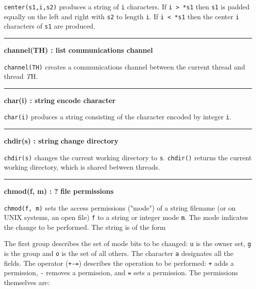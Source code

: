 \noindent
{}\texttt{center(s1,i,s2)} produces a
string of \texttt{i} characters. If \texttt{i {\textgreater} *s1} then
\texttt{s1} is padded equally on the left and right with \texttt{s2} to
length \texttt{i}. If \texttt{i {\textless} *s1} then the center
\texttt{i} characters of \texttt{s1} are produced.

\bigskip
\hrule\vspace{0.1cm}
\noindent
{\bf channel(TH) : list } \hfill {\bf communications channel}

\noindent
{}\texttt{channel(TH)} creates a communications channel
between the current thread and thread {\textit TH}.

\bigskip
\hrule\vspace{0.1cm}
\noindent
{\bf char(i) : string } \hfill {\bf encode character}

\noindent
{}\texttt{char(i)} produces a string consisting of the
character encoded by integer \texttt{i}.

\bigskip
\hrule\vspace{0.1cm}
\noindent
{\bf chdir(s) : string } \hfill {\bf change directory}\WarningNotThreadSafe

\noindent
{}\texttt{chdir(s)} changes the current
working directory to \texttt{s}. \texttt{chdir()} returns the current
working directory, which is shared between threads.


\bigskip
\hrule\vspace{0.1cm}
\noindent
{\bf chmod(f, m) : ? } \hfill {\bf file permissions}

\noindent
{}
\texttt{chmod(f, m)}
sets the access permissions ("mode") of
a string filename (or on UNIX systems, an open file) \texttt{f} to a
string or integer mode \texttt{m}. The mode indicates the change to be
performed. The string is of the form

\iconcode{
\>   [ugoa]*[+-=][rwxRWXstugo]* }%

The first group describes the set of mode bits to be changed: \texttt{u}
is the owner set, \texttt{g} is the group and \texttt{o} is the set of
all others. The character \texttt{a} designates all the fields. The
operator (\texttt{+-=}) describes the operation to be performed:
\texttt{+} adds a permission, \texttt{{}-} removes a permission, and
\texttt{=} sets a permission. The permissions themselves are: 

